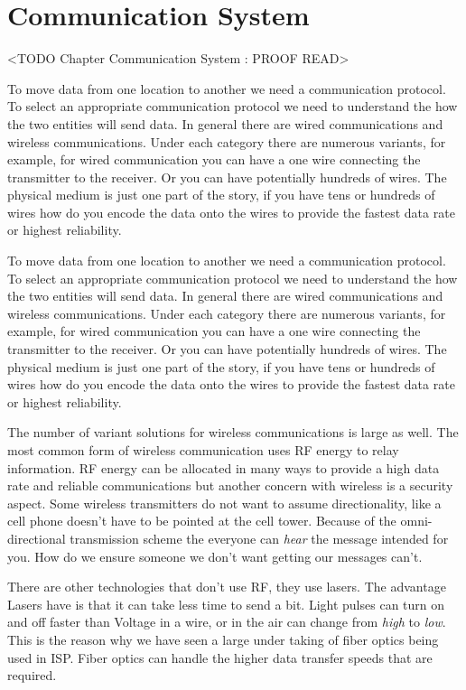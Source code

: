 \chapter{Communication System}
	<TODO Chapter Communication System : PROOF READ>

To move data from one location to another we need a communication protocol. To select an appropriate communication protocol we need to understand the how the two entities will send data. In general there are wired communications and wireless communications. Under each category there are numerous variants, for example, for wired communication you can have a one wire connecting the transmitter to the receiver. Or you can have potentially hundreds of wires. The physical medium is just one part of the story, if you have tens or hundreds of wires how do you encode the data onto the wires to provide the fastest data rate or highest reliability.	
	
To move data from one location to another we need a communication protocol. To select an appropriate communication protocol we need to understand the how the two entities will send data. In general there are wired communications and wireless communications. Under each category there are numerous variants, for example, for wired communication you can have a one wire connecting the transmitter to the receiver. Or you can have potentially hundreds of wires. The physical medium is just one part of the story, if you have tens or hundreds of wires how do you encode the data onto the wires to provide the fastest data rate or highest reliability.

The number of variant solutions for wireless communications is large as well. The most common form of wireless communication uses \ac{RF} energy to relay information. \ac{RF} energy can be allocated in many ways to provide a high data rate and reliable communications but another concern with wireless is a security aspect. Some wireless transmitters do not want to assume directionality, like a cell phone doesn't have to be pointed at the cell tower. Because of the omni-directional transmission scheme the everyone can \emph{hear} the message intended for you. How do we ensure someone we don't want getting our messages can't.

There are other technologies that don't use \ac{RF}, they use lasers. The advantage Lasers have is that it can take less time to send a bit. Light pulses can turn on and off faster than Voltage in a wire, or in the air can change from \emph{high} to \emph{low}. This is the reason why we have seen a large under taking of fiber optics being used in \ac{ISP}. Fiber optics can handle the higher data transfer speeds that are required.

